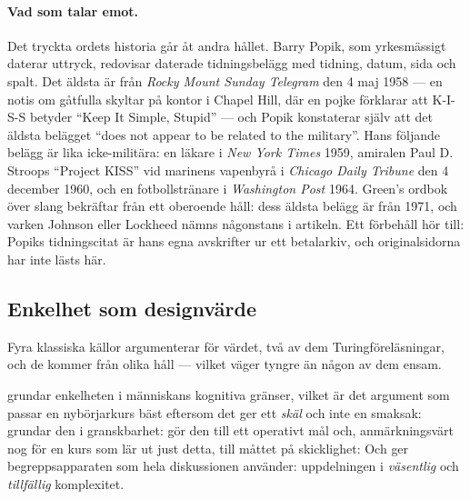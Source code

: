 \paragraph{Vad som talar emot.}  Det tryckta ordets historia går åt andra
hållet.  Barry Popik, som yrkesmässigt daterar uttryck, redovisar daterade
tidningsbelägg med tidning, datum, sida och spalt.  Det äldsta är från
\emph{Rocky Mount Sunday Telegram} den 4 maj 1958 --- en notis om
gåtfulla skyltar på kontor i Chapel Hill, där en pojke förklarar att
K-I-S-S betyder \enquote{Keep It Simple, Stupid} --- och Popik konstaterar
själv att det äldsta belägget \enquote{does not appear to be related to the
military}\autocite{Popik2019KISS}.  Hans följande belägg är lika
icke-militära: en läkare i \emph{New York Times} 1959, amiralen Paul
D. Stroops \enquote{Project KISS} vid marinens vapenbyrå i
\emph{Chicago Daily Tribune} den 4 december 1960, och en fotbollstränare i
\emph{Washington Post} 1964.  Green's ordbok över slang bekräftar från ett
oberoende håll: dess äldsta belägg är från 1971, och varken Johnson eller
Lockheed nämns någonstans i artikeln\autocite{GreenKISS}.  Ett förbehåll
hör till: Popiks tidningscitat är hans egna avskrifter ur ett betalarkiv,
och originalsidorna har inte lästs här.

\subsection*{Enkelhet som designvärde}

Fyra klassiska källor argumenterar för värdet, två av dem
Turingföreläsningar, och de kommer från olika håll --- vilket väger tyngre
än någon av dem ensam.

\Textcite{Dijkstra1972Humble} grundar enkelheten i människans kognitiva
gränser, vilket är det argument som passar en nybörjarkurs bäst eftersom det
ger ett \emph{skäl} och inte en smaksak: 
\Textcite[s.~81]{Hoare1981Emperor} grundar den i granskbarhet:
  \Textcite[s.~68]{Wirth1995Lean} gör den till ett
operativt mål och, anmärkningsvärt nog för en kurs som lär ut just detta,
till måttet på skicklighet:   Och
\textcite{Brooks1987Silver} ger begreppsapparaten som hela diskussionen
använder: uppdelningen i \emph{väsentlig} och \emph{tillfällig} komplexitet.

